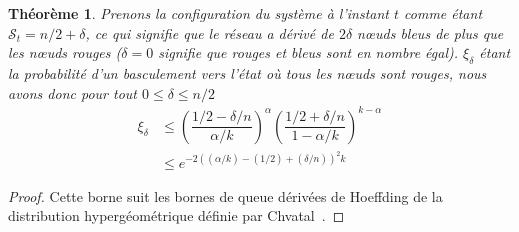 \documentclass[a4,twocolumn,10pt]{article}
\newtheorem{theorem}{Théorème}
\theoremstyle{definition}
\begin{document}

\begin{theorem}
Prenons la configuration du système à l'instant $t$ comme étant $\mathcal{S}_t = n/2 + \delta$, ce qui signifie que le
réseau a dérivé de $2\delta$ nœuds bleus de plus que les nœuds rouges ($\delta = 0$ signifie que rouges et bleus
sont en nombre égal). $\xi_\delta$ étant la probabilité d'un basculement vers l'état où tous les nœuds sont rouges,
nous avons donc pour tout $0 \leq \delta \leq n/2$
\begin{equation}
\begin{split}
    \xi_\delta &\leq \left(\dfrac{1/2 - \delta/n}{\alpha/k}\right)^{\alpha}\left(\dfrac{1/2 + \delta/n}{1- \alpha/k}\right)^{k-\alpha}\\
    &\leq e^{-2((\alpha/k) - (1/2) + (\delta/n))^2 k}
\end{split}
\end{equation}
\end{theorem}

\begin{proof}
Cette borne suit les bornes de queue dérivées de Hoeffding de la distribution hypergéométrique définie par
Chvatal~\cite{chvatal1979tail}.
\end{proof}

\end{document}
